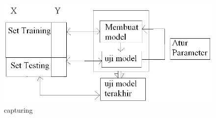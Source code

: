 \begin{enumerate}
\begin{figure}[ht]
\centering
\includegraphics[scale=0.5]{figures/Screenshot_2.jpg}
\caption{capturing}
\label{item}
\end{figure}
\end{enumerate}

